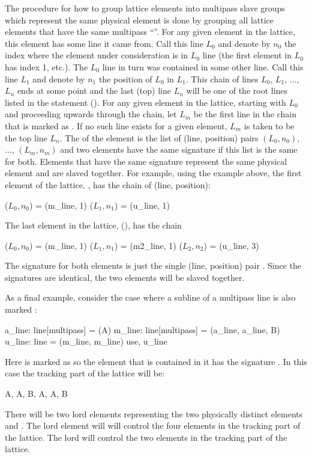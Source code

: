 The procedure for how to group lattice elements into multipass slave groups which represent the same
physical element is done by grouping all lattice elements that have the same multipass
``''. For any given element in the lattice, this element has some line it came
from. Call this line $L_0$ and denote by $n_0$ the index where the element under consideration is in
$L_0$ line (the first element in $L_0$ has index 1, etc.). The $L_0$ line in turn was contained in
some other line. Call this line $L_1$ and denote by $n_1$ the position of $L_0$ in $L_1$. This chain
of lines $L_0$, $L_1$, ..., $L_n$ ends at some point and the last (top) line $L_n$ will be one of
the root lines listed in the  statement (). For any given element in the
lattice, starting with $L_0$ and proceeding upwards through the chain, let $L_m$ be the first line in
the chain that is marked as . If no such line exists for a given element, $L_m$ is
taken to be the top line $L_n$. The  of the element is the list of (line, position)
pairs $(L_0, n_0)$, ..., $(L_m, n_m)$ and two elements have the same signature if this list is the
same for both. Elements that have the same signature represent the same physical element and are slaved
together. For example, using the example above, the first element of the lattice, , has the
chain of (line, position): 
\begin{example}
  (\(L_0, n_0\)) = (m_line, 1)
  (\(L_1, n_1\)) = (u_line, 1)
\end{example} 
The last element in the lattice, (), has the chain
\begin{example}
  (\(L_0, n_0\)) = (m_line, 1)
  (\(L_1, n_1\)) = (m2_line, 1)
  (\(L_2, n_2\)) = (u_line, 3)
\end{example}
The signature for both elements is just the single (line, position) pair . 
Since the signatures are identical, the two elements will be slaved together.

As a final example, consider the case where a subline of a multipass line is also marked
:
\begin{example}
  a_line: line[multipass] = (A)
  m_line: line[multipass] = (a_line, a_line, B)
  u_line: line = (m_line, m_line)
  use, u_line
\end{example}
Here  is marked as  so the  element that is contained in it has the
signature . In this case the tracking part of the lattice will be:
\begin{example}
  A, A, B, A, A, B
\end{example}
There will be two lord elements representing the two physically distinct elements  and .
The  lord element will will control the four  elements in the tracking
part of the lattice. The  lord will control the two  elements in the tracking part
of the lattice. 

